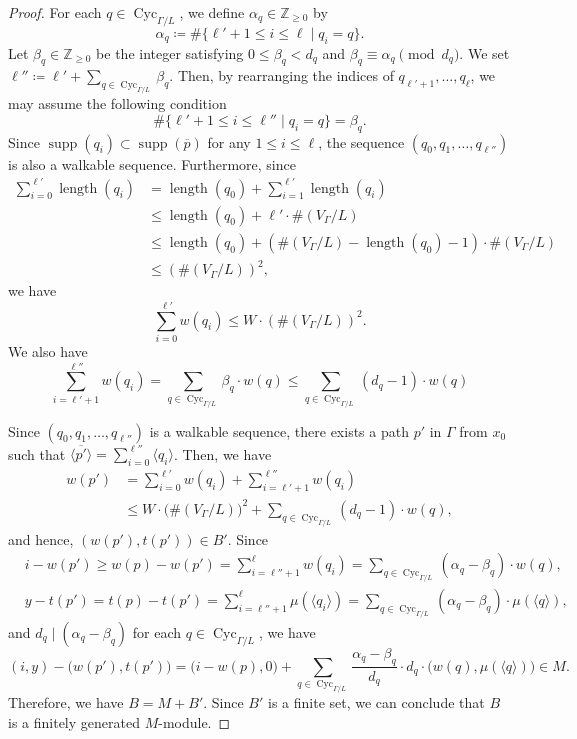 \documentclass[ALCO,published]{cedram}
\theoremstyle{remark}
\begin{document}
\begin{proof}
For each $q \in \operatorname{Cyc}_{\Gamma /L}$, we define $\alpha _q \in \mathbb{Z}_{\ge 0}$ by 
\[
\alpha _q \coloneqq  \# \{ \ell' + 1 \le i \le \ell \mid q_i = q \}. 
\]
Let $\beta _q \in \mathbb{Z}_{\ge 0}$ be the integer satisfying 
$0 \le \beta _q < d_q$ and $\beta _q \equiv \alpha _q \pmod{d_q}$. 
We set $\ell '' \coloneqq  \ell ' + \sum _{q \in \operatorname{Cyc}_{\Gamma /L}} \beta _q$. 
Then, by rearranging the indices of $q_{\ell ' +1}, \ldots, q_{\ell}$, 
we may assume the following condition
\[
\# \{ \ell' + 1 \le i \le \ell '' \mid q_i = q \} = \beta _q. 
\]
Since $\operatorname{supp}(q_i) \subset \operatorname{supp}(\overline{p})$ for any
$1 \le i \le \ell$, the sequence $(q_0, q_1, \ldots , q_{\ell ''})$ is also a walkable sequence. 
Furthermore, since
\begin{align*}
\sum _{i=0} ^{\ell'} \operatorname{length}(q_i)
&= \operatorname{length}(q_0) + \sum _{i=1} ^{\ell'} \operatorname{length}(q_i) \\
&\le \operatorname{length}(q_0) + \ell ' \cdot \# (V_{\Gamma}/L) \\
&\le \operatorname{length}(q_0) + (\# (V_{\Gamma}/L) - \operatorname{length}(q_0) - 1) \cdot \# (V_{\Gamma}/L) \\
&\le (\# (V_{\Gamma}/L))^2, 
\end{align*}
we have 
\[
\sum _{i=0} ^{\ell'} w(q_i) \le W \cdot (\# (V_{\Gamma}/L))^2. 
\]
We also have 
\[
\sum _{i=\ell ' +1} ^{\ell ''} w(q_i) 
= \sum _{q \in \operatorname{Cyc}_{\Gamma /L}} \beta _q \cdot w(q)
\le \sum _{q \in \operatorname{Cyc}_{\Gamma /L}} (d_q - 1) \cdot w(q)
\]

Since $(q_0, q_1, \ldots , q_{\ell ''})$ is a walkable sequence, there exists 
a path $p'$ in $\Gamma$ from $x_0$ such that 
$\langle \overline{p'} \rangle = \sum _{i=0} ^{\ell''} \langle q_i \rangle$. 
Then, we have 
\begin{align*}
w(p') 
&= \sum _{i=0} ^{\ell'} w(q_i) + \sum _{i=\ell ' +1} ^{\ell ''} w(q_i) \\
& \le W \cdot \bigl( \# (V_{\Gamma}/L) \bigr)^2 
    + \sum _{q \in \operatorname{Cyc}_{\Gamma /L}} (d_q - 1) \cdot w(q), 
\end{align*}
and hence, $(w(p'), t(p')) \in B'$. 
Since 
\begin{align*}
&i - w(p') 
\ge w(p) - w(p') 
= \sum _{i=\ell'' +1} ^{\ell} w(q_i)
= \sum _{q \in \operatorname{Cyc}_{\Gamma /L}} (\alpha _q - \beta _q) \cdot w(q), \\
&y-t(p')=t(p)-t(p') 
= \sum _{i=\ell'' +1} ^{\ell} \mu( \langle q_i \rangle)
= \sum _{q \in \operatorname{Cyc}_{\Gamma /L}} (\alpha _q - \beta _q) \cdot \mu( \langle q \rangle), 
\end{align*}
and $d_q \mid (\alpha _q - \beta _q)$ for each $q \in \operatorname{Cyc}_{\Gamma /L}$, 
we have 
\[
(i,y) - \bigl( w(p'), t(p') \bigr) 
= \bigl( i-w(p) ,0 \bigr ) 
+ \sum _{q \in \operatorname{Cyc}_{\Gamma /L}} \frac{\alpha _q - \beta _q}{d_q} 
\cdot d_q \cdot \bigl( w(q), \mu (\langle q \rangle) \bigr)
\in M. 
\]
Therefore, we have $B = M + B'$. 
Since $B'$ is a finite set, we can conclude that 
$B$ is a finitely generated $M$-module. 
\end{proof}
\end{document}

